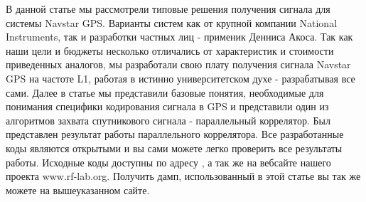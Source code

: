 \documentclass[a4paper,12pt]{article}
\numberwithin{table}{section}
\begin{document}
В данной статье мы рассмотрели типовые решения получения сигнала для системы Navstar GPS. Варианты систем
как от крупной компании National Instruments, так и разработки частных лиц - применик Денниса Акоса. 
Так как наши цели и бюджеты несколько отличались от характеристик и стоимости приведенных аналогов, мы разработали
свою плату получения сигнала Navstar GPS на частоте L1, работая в истинно университетском духе - разрабатывая все сами.
Далее в статье мы представили базовые понятия, необходимые для понимания специфики кодирования сигнала в  GPS и
представили один из алгоритмов захвата спутникового сигнала - параллельный коррелятор. Был представлен
результат работы параллельного коррелятора. Все разработанные коды являются открытыми и вы сами можете легко проверить
все результаты работы. Исходные коды доступны по адресу \cite{gpsproject}, а так же на вебсайте нашего проекта www.rf-lab.org.
Получить дамп, использованный в этой статье вы так же можете на вышеуказанном сайте.


\end{document}
